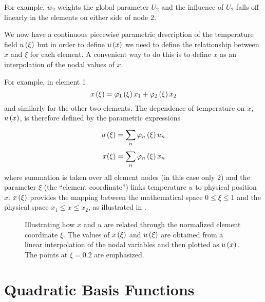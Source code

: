 For example, $w_{2}$ weights the global parameter $U_{2}$ and the influence of
$U_{2}$ falls off linearly in the elements on either side of node 2.

We now have a continuous piecewise parametric description of the temperature
field $ u\left( \xi \right) $ but in order to define $ u\left( x \right) $ we need to define
the relationship between $x$ and $\xi$ for each element. A convenient way to
do this is to define $x$ as an interpolation of the nodal values of $x$.

For example, in element 1
\begin{equation}
   x\left( \xi \right)  =    \varphi_{1} \left( \xi \right)  x_{1} +    \varphi_{2} \left( \xi \right)  x_{2}
\end{equation}
and similarly for the other two elements. The dependence of temperature on $x$,
$ u\left( x \right) $, is therefore defined by the parametric expressions
\begin{align*}
   u\left( \xi \right)  &=  \displaystyle\sum_{n}^{}     \varphi_{n} \left( \xi \right)   u_{n} \\
  x(\xi) &=  \displaystyle\sum_{n}^{}     \varphi_{n} \left( \xi \right)   x_{n}
\end{align*}
where summation is taken over all element nodes (in this case only $2$) and
the parameter $\xi$ (the ``element coordinate'') links temperature $u$ to
physical position $x$. $ x\left( \xi \right) $ provides the mapping between the
mathematical space $0 \leq \xi \leq 1$ and the physical space $x_{1} \leq x \leq
x_{2}$, as illustrated in .

\begin{figure}[htbp] \centering
  
  \caption{Illustrating how $x$ and $u$ are related through the normalized 
    element coordinate $\xi$. The values of $ x\left( \xi \right) $ and $ u\left( \xi \right) $ are 
    obtained from a linear interpolation of the nodal variables and then 
    plotted as $ u\left( x \right) $. The points at $\xi=0.2$ are emphasized.}
  \label{fig:xandurel}
\end{figure}

\section{Quadratic Basis Functions}

